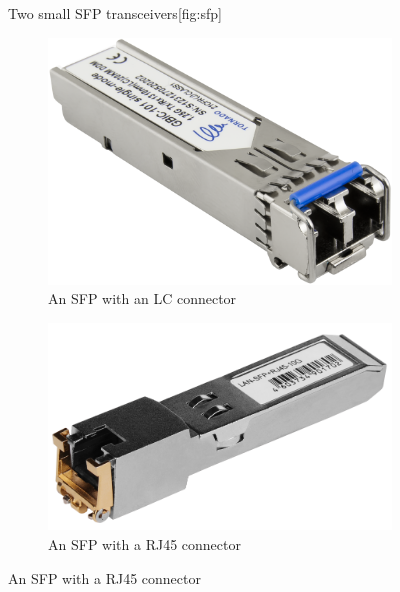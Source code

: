 \begin{figure}
\begin{sidecaption}{Two small \acf{SFP} transceivers}[fig:sfp]
   \begin{subfigure}[b]{0.45\textwidth}
   \centering
   \includegraphics[width=\textwidth]{images/physical/sfp.png}
   \caption{An \acs{SFP} with an \acs{LC} connector}
   \label{fig:sfp-lc}
   \end{subfigure}
   \hfill
   \begin{subfigure}[b]{0.45\textwidth}
   \centering
   \includegraphics[width=\textwidth]{images/physical/sfp-rj45.png}
   \caption{An \acs{SFP} with a \acs{RJ45} connector}
   \label{fig:sfp-rj45}
   \end{subfigure}
\end{sidecaption}
\end{figure}

